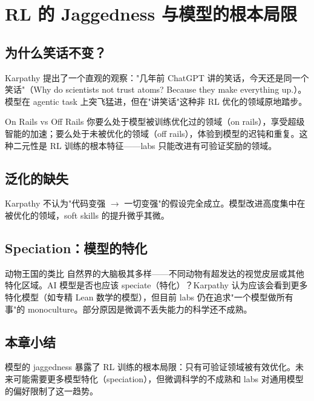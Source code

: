 \section{RL 的 Jaggedness 与模型的根本局限}

\subsection{为什么笑话不变？}

Karpathy 提出了一个直观的观察："几年前 ChatGPT 讲的笑话，今天还是同一个笑话"（Why do scientists not trust atoms? Because they make everything up.）。模型在 agentic task 上突飞猛进，但在"讲笑话"这种非 RL 优化的领域原地踏步。

\begin{importantbox}{On Rails vs Off Rails}
你要么处于模型被训练优化过的领域（on rails），享受超级智能的加速；要么处于未被优化的领域（off rails），体验到模型的迟钝和重复。这种二元性是 RL 训练的根本特征——labs 只能改进有可验证奖励的领域。
\end{importantbox}

\subsection{泛化的缺失}

Karpathy 不认为"代码变强 $\rightarrow$ 一切变强"的假设完全成立。模型改进高度集中在被优化的领域，soft skills 的提升微乎其微。

\subsection{Speciation：模型的特化}

\begin{knowledgebox}{动物王国的类比}
自然界的大脑极其多样——不同动物有超发达的视觉皮层或其他特化区域。AI 模型是否也应该 speciate（特化）？Karpathy 认为应该会看到更多特化模型（如专精 Lean 数学的模型），但目前 labs 仍在追求"一个模型做所有事"的 monoculture。部分原因是微调不丢失能力的科学还不成熟。
\end{knowledgebox}

\subsection{本章小结}

模型的 jaggedness 暴露了 RL 训练的根本局限：只有可验证领域被有效优化。未来可能需要更多模型特化（speciation），但微调科学的不成熟和 labs 对通用模型的偏好限制了这一趋势。


